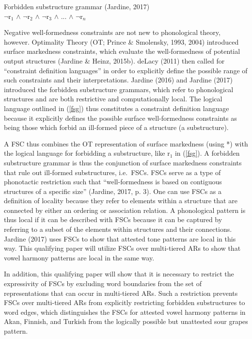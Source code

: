 \documentclass[,doc,floatsintext]{apa6}
\theoremstyle{definition}
\theoremstyle{definition}
\theoremstyle{definition}
\theoremstyle{remark}
\begin{document}
\begin{exe}
\ex Forbidden substructure grammar (Jardine, 2017) \label{fsg} \\
$\neg$r$_1$ $\wedge$ $\neg$r$_2$ $\wedge$ $\neg$r$_3$ $\wedge$ ... $\wedge$ $\neg$r$_n$
\end{exe}

Negative well-formedness constraints are not new to phonological theory,
however. Optimality Theory (OT; Prince \& Smolensky, 1993, 2004)
introduced surface markedness constraints, which evaluate the
well-formedness of potential output structures (Jardine \& Heinz,
2015b). deLacy (2011) then called for \enquote{constraint definition
languages} in order to explicitly define the possible range of such
constraints and their interpretations. Jardine (2016) and Jardine (2017)
introduced the forbidden substructure grammars, which refer to
phonological structures and are both restrictive and computationally
local. The logical language outlined in (\ref{fsg}) thus constitutes a
constraint definition language because it explicitly defines the
possible surface well-formedness constraints as being those which forbid
an ill-formed piece of a structure (a substructure).

A FSC thus combines the OT representation of surface markedness (using
*) with the logical language for forbidding a substructure, like r\(_1\)
in (\ref{fsg}). A forbidden substructure grammar is thus the conjunction
of surface markedness constraints that rule out ill-formed
substructures, i.e.~FSCs. FSCs serve as a type of phonotactic
restriction such that \enquote{well-formedness is based on contiguous
structures of a specific size} (Jardine, 2017, p. 3). One can use FSCs
as a definition of locality because they refer to elements within a
structure that are connected by either an ordering or association
relation. A phonological pattern is thus local if it can be described
with FSCs because it can be captured by referring to a subset of the
elements within structures and their connections. Jardine (2017) uses
FSCs to show that attested tone patterns are local in this way. This
qualifying paper will utilize FSCs over multi-tiered ARs to show that
vowel harmony patterns are local in the same way.

In addition, this qualifying paper will show that it is necessary to
restrict the expressivity of FSCs by excluding word boundaries from the
set of representations that can occur in multi-tiered ARs. Such a
restriction prevents FSCs over multi-tiered ARs from explicitly
restricting forbidden substructures to word edges, which distinguishes
the FSCs for attested vowel harmony patterns in Akan, Finnish, and
Turkish from the logically possible but unattested sour grapes pattern.
\end{document}
